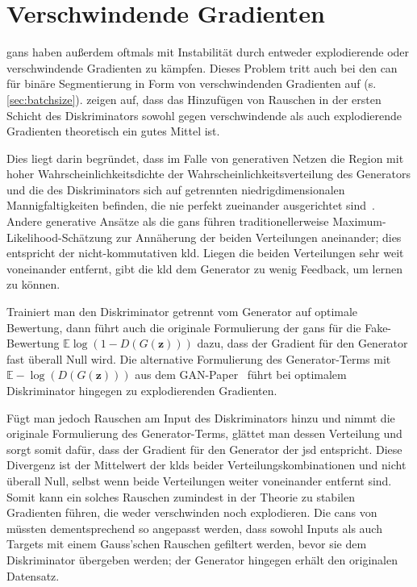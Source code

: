 \section{Verschwindende Gradienten}

\glspl{gan} haben außerdem oftmals mit Instabilität durch entweder explodierende oder verschwindende Gradienten zu kämpfen.
Dieses Problem tritt auch bei den \gls{can} für binäre Segmentierung in Form von verschwindenden Gradienten auf (s. \autoref{sec:batchsize}).
\citeauthor{Arjovsky.2017} zeigen auf, dass das Hinzufügen von Rauschen in der ersten Schicht des Diskriminators sowohl gegen verschwindende als auch explodierende Gradienten theoretisch ein gutes Mittel ist.

Dies liegt darin begründet, dass im Falle von generativen Netzen die Region mit hoher Wahrscheinlichkeitsdichte der Wahrscheinlichkeitsverteilung des Generators und die des Diskriminators sich auf getrennten niedrigdimensionalen Mannigfaltigkeiten befinden, die nie perfekt zueinander ausgerichtet sind~\cite{Arjovsky.2017}.
Andere generative Ansätze als die \glspl{gan} führen traditionellerweise Maximum-Likelihood-Schätzung zur Annäherung der beiden Verteilungen aneinander; dies entspricht der nicht-kommutativen \gls{kld}.
Liegen die beiden Verteilungen sehr weit voneinander entfernt, gibt die \gls{kld} dem Generator zu wenig Feedback, um lernen zu können.

Trainiert man den Diskriminator getrennt vom Generator auf optimale Bewertung, dann führt auch die originale Formulierung der \glspl{gan} für die Fake-Bewertung $ \mathbb{E}\log(1 - D(G(\mathbf{z}))) $ dazu, dass der Gradient für den Generator fast überall Null wird.
Die alternative Formulierung des Generator-Terms mit $ \mathbb{E}-\log(D(G(\mathbf{z}))) $ aus dem GAN-Paper~\cite{Goodfellow.2014} führt bei optimalem Diskriminator hingegen zu explodierenden Gradienten.

Fügt man jedoch Rauschen am Input des Diskriminators hinzu und nimmt die originale Formulierung des Generator-Terms, glättet man dessen Verteilung und sorgt somit dafür, dass der Gradient für den Generator der \gls{jsd} entspricht.
Diese Divergenz ist der Mittelwert der \glspl{kld} beider Verteilungskombinationen und nicht überall Null, selbst wenn beide Verteilungen weiter voneinander entfernt sind.
Somit kann ein solches Rauschen zumindest in der Theorie zu stabilen Gradienten führen, die weder verschwinden noch explodieren.
Die \glspl{can} von \citeauthor{Isola.2017} müssten dementsprechend so angepasst werden, dass sowohl Inputs als auch Targets mit einem Gauss'schen Rauschen gefiltert werden, bevor sie dem Diskriminator übergeben werden; der Generator hingegen erhält den originalen Datensatz.

